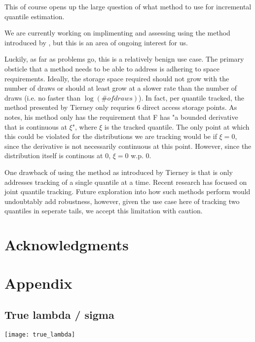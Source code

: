This of course opens up the large question of what method to use for incremental quantile estimation.

We are currently working on implimenting and assessing using the method introduced by \cite{Tierney1983}, but this is an area of ongoing interest for us.

Luckily, as far as problems go, this is a relatively benign use case. The primary obsticle that a method needs to be able to address is adhering to space requirements. Ideally, the storage space required should not grow with the number of draws or should at least grow at a slower rate than the number of draws (i.e. no faster than $\log(\# of draws)$). In fact, per quantile tracked, the method presented by Tierney only requries 6 direct access storage points. As \cite{Tierney1983} notes, his method only has the requirement that F has "a bounded derivative that is continuous at $\xi$", where $\xi$ is the tracked quantile. The only point at which this could be violated for the distributions we are tracking would be if $\xi = 0$, since the derivative is not necessarily continuous at this point. However, since the distribution itself is continous at 0, $\xi = 0$ w.p. 0.

One drawback of using the method as introduced by Tierney is that is only addresses tracking of a single quantile at a time. Recent research has focused on joint quantile tracking. Future exploration into how such methods perform would undoubtably add robustness, however, given the use case here of tracking two quantiles in seperate tails, we accept this limitation with caution.

\section*{Acknowledgments}

\section*{Appendix}

\subsection{True lambda / sigma}

\texttt{[image: true\_lambda]}
